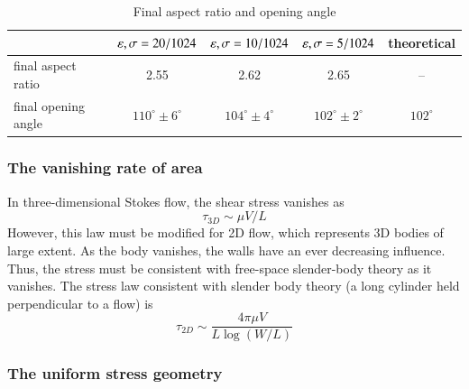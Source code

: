 \documentclass[preprint, 10pt]{elsarticle}
\begin{document}
\begin{table}%
\begin{center}
\caption{Final aspect ratio and opening angle
} 
\vspace{0.3 pc}
\begin{tabular}{l | c c c c}
\hline
{} & $\varepsilon, \sigma = 20/1024$ & $\varepsilon, \sigma = 10/1024$ & $\varepsilon, \sigma = 5/1024$ & theoretical \\
\hline
final aspect ratio & 2.55 & 2.62 & 2.65 & -- \\
final opening angle & $110^\circ \pm 6^\circ$ & $104^\circ \pm 4^\circ$ & $102^\circ \pm 2^\circ$ & $102^\circ$
\end{tabular}
\end{center}
\end{table}


\subsubsection{The vanishing rate of area}
In three-dimensional Stokes flow, the shear stress vanishes as
\begin{equation}
\tau_{3D} \sim \mu V/L
\end{equation}
However, this law must be modified for 2D flow, which represents 3D bodies of large extent. As the body vanishes, the walls have an ever decreasing influence. Thus, the stress must be consistent with free-space slender-body theory as it vanishes. The stress law consistent with slender body theory (a long cylinder held perpendicular to a flow) is
\begin{equation}
\tau_{2D} \sim \frac{4 \pi \mu V}{L \log(W/L)}
\end{equation}

\subsubsection{The uniform stress geometry}


\newpage
\end{document}
